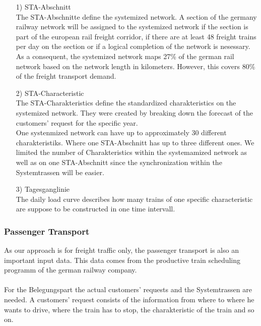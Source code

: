 \begin{itemize}
	\item[1)] STA-Abschnitt \\
	The STA-Abschnitte define the systemized network. A section of the germany railway network will be assigned to the systemized network if the section is part of the european rail freight corridor, if there are at least 48 freight trains per day on the section or if a logical completion of the network is nesessary. \\
	As a consequent, the systemized network maps 27\% of the german rail network based on the network length in kilometers. However, this covers 80\% of the freight transport demand. 
	
	\item[2)] STA-Characteristic \\
	The STA-Charakteristics define the standardized charakteristics on the systemized network. They were created by breaking down the forecast of the customers' request for the specific year. \\
	One systenmized network can have up to approximately 30 different charakteristiks. Where one STA-Abschnitt has up to three different ones. We limited the number of Charakteristics within the systemamized network as well as on one STA-Abschnitt since the synchronization within the Systemtrassen will be easier. 
	
	\item[3)] Tagesganglinie \\
	The daily load curve describes how many trains of one specific characteristic are suppose to be constructed in one time intervall. 
\end{itemize}

\subsubsection{Passenger Transport}
As our approach is for freight traffic only, the passenger transport is also an important input data. This data comes from the productive train scheduling programm of the german railway company. \\ 
\\
For the Belegungspart the actual customers' requests and the Systemtrassen are needed. A customers' request consists of the information from where to where he wants to drive, where the train has to stop, the charakteristic of the train and so on.\\

